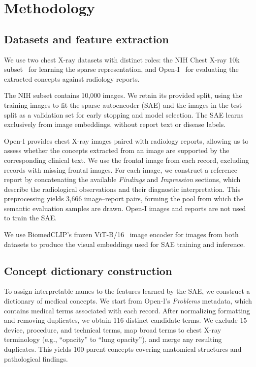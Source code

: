 \section{Methodology}

\subsection{Datasets and feature extraction}
We use two chest X-ray datasets with distinct roles: the NIH Chest X-ray 10k subset~\cite{gronimo_nih10k} for learning the sparse representation, and Open-I~\cite{ykumards_openi} for evaluating the extracted concepts against radiology reports.

The NIH subset contains 10,000 images. We retain its provided split, using the training images to fit the sparse autoencoder (SAE) and the images in the test split as a validation set for early stopping and model selection. The SAE learns exclusively from image embeddings, without report text or disease labels.

Open-I provides chest X-ray images paired with radiology reports, allowing us to assess whether the concepts extracted from an image are supported by the corresponding clinical text. We use the frontal image from each record, excluding records with missing frontal images. For each image, we construct a reference report by concatenating the available \emph{Findings} and \emph{Impression} sections, which describe the radiological observations and their diagnostic interpretation. This preprocessing yields 3,666 image--report pairs, forming the pool from which the semantic evaluation samples are drawn. Open-I images and reports are not used to train the SAE.

We use BiomedCLIP's frozen ViT-B/16~\cite{zhang2023biomedclip} image encoder for images from both datasets to produce the visual embeddings used for SAE training and inference.


\subsection{Concept dictionary construction}
To assign interpretable names to the features learned by the SAE, we construct a dictionary of medical concepts. We start from Open-I's \emph{Problems} metadata, which contains medical terms associated with each record. After normalizing formatting and removing duplicates, we obtain 116 distinct candidate terms. We exclude 15 device, procedure, and technical terms, map broad terms to chest X-ray terminology (e.g., “opacity” to “lung opacity”), and merge any resulting duplicates. This yields 100 parent concepts covering anatomical structures and pathological findings.

